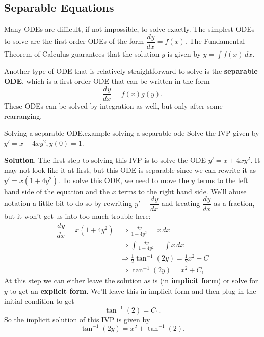 \documentclass[10pt,]{book}
\newcommand{\terminology}[1]{\textbf{#1}}
\numberwithin{equation}{section}
\newcommand{\dv}[3][]{\dfrac{d^{#1} #2}{d #3^{#1}}}
\begin{document}
\subsection[{Separable Equations}]{Separable Equations}\label{subsection-separable-equations}
\hypertarget{p-729}{}%
Many ODEs are difficult, if not impossible, to solve exactly. The simplest ODEs to solve are the first-order ODEs of the form \(\dv{y}{x} = f(x)\). The Fundamental Theorem of Calculus guarantees that the solution \(y\) is given by \(y = \int f(x)\,dx\).%
\par
\hypertarget{p-730}{}%
Another type of ODE that is relatively straightforward to solve is the \terminology{separable ODE}, which is a first-order ODE that can be written in the form%
%
\begin{equation*}
\dv{y}{x} = f(x)g(y).
\end{equation*}
\hypertarget{p-731}{}%
These ODEs can be solved by integration as well, but only after some rearranging.%
\begin{example}{Solving a separable ODE.}{example-solving-a-separable-ode}%
\hypertarget{p-732}{}%
Solve the IVP given by \(y' = x+4xy^{2}, y(0)=1\).%
\par\smallskip%
\noindent\textbf{Solution}.\hypertarget{solution-154}{}\quad%
\hypertarget{p-733}{}%
The first step to solving this IVP is to solve the ODE \(y' = x+4xy^{2}\). It may not look like it at first, but this ODE is separable since we can rewrite it as \(y' = x(1+4y^{2})\). To solve this ODE, we need to move the \(y\) terms to the left hand side of the equation and the \(x\) terms to the right hand side. We'll abuse notation a little bit to do so by rewriting \(y' = \dv{y}{x}\) and treating \(\dv{y}{x}\) as a fraction, but it won't get us into too much trouble here:%
%
\begin{align*}
\dv{y}{x} = x(1+4y^{2}) &\Rightarrow \frac{dy}{1+4y^{2}} = x\,dx \\
&\Rightarrow \int\frac{dy}{1+4y^{2}}  = \int x\,dx \\
&\Rightarrow \frac{1}{2}\tan^{-1}(2y)  = \frac{1}{2}x^{2}+C \\
&\Rightarrow \tan^{-1}(2y)  = x^{2}+C_{1} 
\end{align*}
\hypertarget{p-734}{}%
At this step we can either leave the solution as is (in \terminology{implicit form}) or solve for \(y\) to get an \terminology{explicit form}. We'll leave this in implicit form and then plug in the initial condition to get%
\begin{equation*}
\tan^{-1}(2) = C_{1}.
\end{equation*}
So the implicit solution of this IVP is given by%
\begin{equation*}
\tan^{-1}(2y) = x^{2}+\tan^{-1}(2).
\end{equation*}
%
\end{example}
\end{document}
